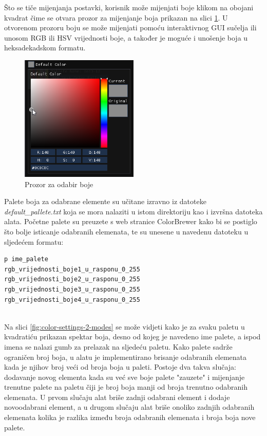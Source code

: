 \documentclass[times, utf8, diplomski]{fer}
\begin{document}
Što se tiče mijenjanja postavki, korisnik može mijenjati boje klikom na obojani kvadrat čime se otvara prozor za mijenjanje boja prikazan na slici \ref{fig:color-picker}. U otvorenom prozoru boju se može mijenjati pomoću interaktivnog GUI sučelja ili unosom RGB ili HSV vrijednosti boje, a također je moguće i unošenje boja u heksadekadskom formatu.

\begin{figure} [H]
	\centering
    \includegraphics[width=0.5\textwidth]{color_settings_color_picker.png}
    \caption{Prozor za odabir boje}
    \label{fig:color-picker}
\end{figure}

Palete boja za odabrane elemente su učitane izravno iz datoteke \textit{default\_pallete.txt} koja se mora nalaziti u istom direktoriju kao i izvršna datoteka alata. Početne palete su preuzete s web stranice ColorBrewer \citep{colorbrewer} kako bi se postiglo što bolje isticanje odabranih elemenata, te su unesene u navedenu datoteku u sljedećem formatu:

\begin{lstlisting}
p ime_palete
rgb_vrijednosti_boje1_u_rasponu_0_255
rgb_vrijednosti_boje2_u_rasponu_0_255
rgb_vrijednosti_boje3_u_rasponu_0_255
rgb_vrijednosti_boje4_u_rasponu_0_255
\end{lstlisting}
\ 
\\

Na slici \ref{fig:color-settings-2-modes} se može vidjeti kako je za svaku paletu u kvadratiću prikazan spektar boja, desno od kojeg je navedeno ime palete, a ispod imena se nalazi gumb za prelazak na sljedeću paletu. Kako palete sadrže ograničen broj boja, u alatu je implementirano brisanje odabranih elemenata kada je njihov broj veći od broja boja u paleti. Postoje dva takva slučaja: dodavanje novog elementa kada su već sve boje palete "zauzete" i mijenjanje trenutne palete na paletu čiji je broj boja manji od broja trenutno odabranih elemenata. U prvom slučaju alat briše zadnji odabrani element i dodaje novoodabrani element, a u drugom slučaju alat briše onoliko zadnjih odabranih elemenata kolika je razlika između broja odabranih elemenata i broja boja nove palete.\\
\end{document}
